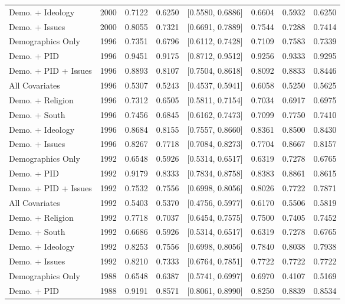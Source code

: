 \begin{longtable}{lrrrlrrr}
  Demo. + Ideology & 2000 & 0.7122 & 0.6250 & [0.5580, 0.6886] & 0.6604 & 0.5932 & 0.6250 \\ 
  Demo. + Issues & 2000 & 0.8055 & 0.7321 & [0.6691, 0.7889] & 0.7544 & 0.7288 & 0.7414 \\ 
  Demographics Only & 1996 & 0.7351 & 0.6796 & [0.6112, 0.7428] & 0.7109 & 0.7583 & 0.7339 \\ 
  Demo. + PID & 1996 & 0.9451 & 0.9175 & [0.8712, 0.9512] & 0.9256 & 0.9333 & 0.9295 \\ 
  Demo. + PID + Issues & 1996 & 0.8893 & 0.8107 & [0.7504, 0.8618] & 0.8092 & 0.8833 & 0.8446 \\ 
  All Covariates & 1996 & 0.5307 & 0.5243 & [0.4537, 0.5941] & 0.6058 & 0.5250 & 0.5625 \\ 
  Demo. + Religion & 1996 & 0.7312 & 0.6505 & [0.5811, 0.7154] & 0.7034 & 0.6917 & 0.6975 \\ 
  Demo. + South & 1996 & 0.7456 & 0.6845 & [0.6162, 0.7473] & 0.7099 & 0.7750 & 0.7410 \\ 
  Demo. + Ideology & 1996 & 0.8684 & 0.8155 & [0.7557, 0.8660] & 0.8361 & 0.8500 & 0.8430 \\ 
  Demo. + Issues & 1996 & 0.8267 & 0.7718 & [0.7084, 0.8273] & 0.7704 & 0.8667 & 0.8157 \\ 
  Demographics Only & 1992 & 0.6548 & 0.5926 & [0.5314, 0.6517] & 0.6319 & 0.7278 & 0.6765 \\ 
  Demo. + PID & 1992 & 0.9179 & 0.8333 & [0.7834, 0.8758] & 0.8383 & 0.8861 & 0.8615 \\ 
  Demo. + PID + Issues & 1992 & 0.7532 & 0.7556 & [0.6998, 0.8056] & 0.8026 & 0.7722 & 0.7871 \\ 
  All Covariates & 1992 & 0.5403 & 0.5370 & [0.4756, 0.5977] & 0.6170 & 0.5506 & 0.5819 \\ 
  Demo. + Religion & 1992 & 0.7718 & 0.7037 & [0.6454, 0.7575] & 0.7500 & 0.7405 & 0.7452 \\ 
  Demo. + South & 1992 & 0.6686 & 0.5926 & [0.5314, 0.6517] & 0.6319 & 0.7278 & 0.6765 \\ 
  Demo. + Ideology & 1992 & 0.8253 & 0.7556 & [0.6998, 0.8056] & 0.7840 & 0.8038 & 0.7938 \\ 
  Demo. + Issues & 1992 & 0.8210 & 0.7333 & [0.6764, 0.7851] & 0.7722 & 0.7722 & 0.7722 \\ 
  Demographics Only & 1988 & 0.6548 & 0.6387 & [0.5741, 0.6997] & 0.6970 & 0.4107 & 0.5169 \\ 
  Demo. + PID & 1988 & 0.9191 & 0.8571 & [0.8061, 0.8990] & 0.8250 & 0.8839 & 0.8534 \\ 

\end{longtable}
